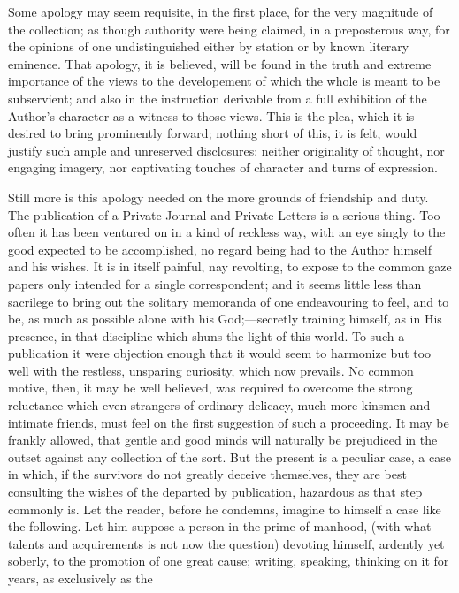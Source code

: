 Some apology may seem
requisite, in the first place, for the very magnitude of the
collection; as though authority were being claimed, in a preposterous
way, for the opinions of one undistinguished either by station or by
known literary eminence. That apology, it is believed, will be found
in the truth and extreme importance of the views to the developement
of which the whole is meant to be subservient; and also in the
instruction derivable from a full exhibition of the Author's character
as a witness to those views. This is the plea, which it is desired to
bring prominently forward; nothing short of this, it is felt, would
justify such ample and unreserved disclosures: neither originality of
thought, nor engaging imagery, nor captivating touches of character
and turns of expression.

Still more is this apology
needed on the more grounds of friendship and duty. The publication of
a Private Journal and Private Letters is a serious thing. Too often it
has been ventured on in a kind of reckless way, with an eye singly to
the good expected to be accomplished, no regard being had to the
Author himself and his wishes. It is in itself painful, nay revolting,
to expose to the common gaze papers only intended for a single
correspondent; and it seems little less than sacrilege to bring out
the solitary memoranda of one endeavouring to feel, and to be, as much
as possible alone with his God;—secretly training himself, as in His
presence, in that discipline which shuns the light of this world. To
such a publication it were objection enough that it would seem to
harmonize but too well with the restless, unsparing curiosity, which
now prevails. No common motive, then, it may be well believed, was
required to overcome the strong reluctance which even strangers of
ordinary delicacy, much more kinsmen and intimate friends, must feel
on the first suggestion of such a proceeding. It may be frankly
allowed, that gentle and good minds will naturally be prejudiced in
the outset against any collection of the sort. But the present is a
peculiar case, a case in which, if the survivors do not greatly
deceive themselves, they are best consulting the wishes of the
departed by publication, hazardous as that step commonly is. Let the
reader, before he condemns, imagine to himself a case like the
following. Let him suppose a person in the prime of manhood, (with
what talents and acquirements is not now the question) devoting
himself, ardently yet soberly, to the promotion of one great cause;
writing, speaking, thinking on it for years, as exclusively as the
